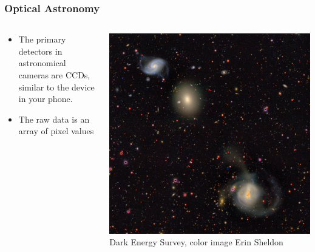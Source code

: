 \documentclass{beamer}
\begin{document}
\frame
{

    \frametitle{Optical Astronomy}


    \begin{columns}
        \begin{column}{0.5\textwidth}
            \begin{itemize}

                \item The primary detectors in astronomical cameras are CCDs,
                    similar to the device in your phone.
                    
                \item The raw data is an array of pixel values



            \end{itemize}
        \end{column}
        \begin{column}{0.5\textwidth}
            \begin{center}
                \includegraphics[width=\textwidth]{DES0428-4748_gri_sv_mask_streaks_color_trim.jpg}
                \newline
                {\tiny Dark Energy Survey, color image Erin Sheldon}
            \end{center}

            
        \end{column}
    \end{columns}


}
\end{document}
